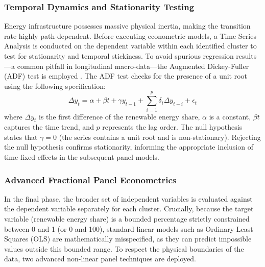 \documentclass[a4paper,11pt]{article}
\begin{document}
\subsubsection{Temporal Dynamics and Stationarity Testing}
Energy infrastructure possesses massive physical inertia, making the transition rate highly path-dependent.
Before executing econometric models, a Time Series Analysis is conducted on the dependent variable within each identified cluster to test for stationarity and temporal stickiness.
To avoid spurious regression results—a common pitfall in longitudinal macro-data—the Augmented Dickey-Fuller (ADF) test is employed \parencite{dickey1979}.
The ADF test checks for the presence of a unit root using the following specification:
\begin{equation}
    \Delta y_t = \alpha + \beta t + \gamma y_{t-1} + \sum_{i=1}^p \delta_i \Delta y_{t-i} + \epsilon_t
\end{equation}
where $\Delta y_t$ is the first difference of the renewable energy share, $\alpha$ is a constant, $\beta t$ captures the time trend, and $p$ represents the lag order.
The null hypothesis states that $\gamma = 0$ (the series contains a unit root and is non-stationary).
Rejecting the null hypothesis confirms stationarity, informing the appropriate inclusion of time-fixed effects in the subsequent panel models.

\subsubsection{Advanced Fractional Panel Econometrics}
In the final phase, the broader set of independent variables is evaluated against the dependent variable separately for each cluster.
Crucially, because the target variable (renewable energy share) is a bounded percentage strictly constrained between 0 and 1 (or 0 and 100), standard linear models such as Ordinary Least Squares (OLS) are mathematically misspecified, as they can predict impossible values outside this bounded range.
To respect the physical boundaries of the data, two advanced non-linear panel techniques are deployed.
\end{document}
